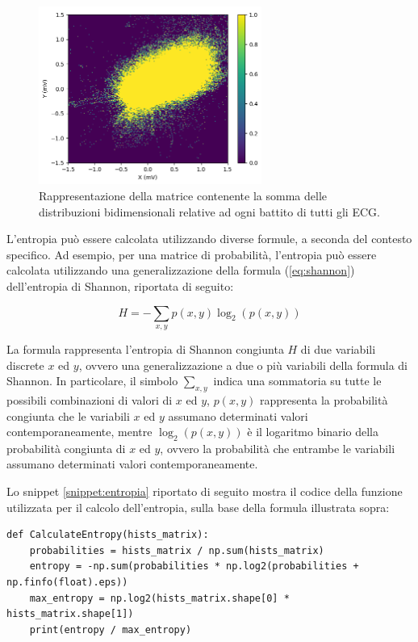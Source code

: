 \begin{figure}[H]
    \centering
    \includegraphics[width=0.65\textwidth]{immagini/hists.png}
    \captionsetup{justification=centering}
    \caption{Rappresentazione della matrice contenente la somma delle distribuzioni bidimensionali relative ad ogni battito di tutti gli ECG.}
    \label{fig:hists}
\end{figure}

L’entropia può essere calcolata utilizzando diverse formule, a seconda del contesto specifico. Ad esempio, per una matrice di probabilità, l’entropia può essere calcolata utilizzando una generalizzazione della formula (\ref{eq:shannon}) dell’entropia di Shannon, riportata di seguito:

\begin{equation}
    H = - \sum_{x,y} p(x,y) \log_2(p(x,y))
    \label{eq:shannon}
\end{equation}

La formula rappresenta l'entropia di Shannon congiunta $ H $ di due variabili discrete $ x $ ed $ y $, ovvero una generalizzazione a due o più variabili della formula di Shannon. In particolare, il simbolo $ \sum_{x,y} $ indica una sommatoria su tutte le possibili combinazioni di valori di $ x $ ed $ y $, $ p(x,y) $ rappresenta la probabilità congiunta che le variabili $ x $ ed $ y $ assumano determinati valori contemporaneamente, mentre $ \log_2(p(x,y)) $ è il logaritmo binario della probabilità congiunta di $ x $ ed $ y $, ovvero la probabilità che entrambe le variabili assumano determinati valori contemporaneamente.

Lo snippet \ref{snippet:entropia} riportato di seguito mostra il codice della funzione utilizzata per il calcolo dell'entropia, sulla base della formula illustrata sopra:

\lstset{language=Python}
\begin{lstlisting}[aboveskip=15pt, belowskip=15pt, basicstyle=\fontsize{8}{10}\selectfont, keywordstyle=\color{blue}, breaklines=true, label=snippet:entropia]
def CalculateEntropy(hists_matrix):
    probabilities = hists_matrix / np.sum(hists_matrix)
    entropy = -np.sum(probabilities * np.log2(probabilities + np.finfo(float).eps))
    max_entropy = np.log2(hists_matrix.shape[0] * hists_matrix.shape[1])
    print(entropy / max_entropy)
\end{lstlisting}

